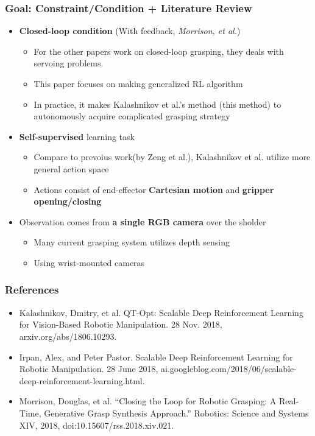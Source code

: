 \documentclass{beamer}
\newcommand{\secondSec}{Goal}
\begin{document}
  \begin{frame}
    \frametitle{\secondSec : Constraint/Condition + Literature Review}
    \begin{itemize}
      \item \textbf{Closed-loop condition} (With feedback, \textit{\scriptsize{Morrison, et al.}})
      \begin{itemize}
        \item For the other papers work on closed-loop grasping, they deals with servoing problems.
        \item This paper focuses on making generalized RL algorithm
        \item In practice, it makes Kalashnikov et al.'s method (this method)
              to autonomously acquire complicated grasping strategy
      \end{itemize}
      \pause
      \item \textbf{Self-supervised} learning task
      \begin{itemize}
        \item Compare to prevoius work(by Zeng et al.), Kalashnikov et al. utilize more general action space
        \item Actions consist of end-effector \textbf{Cartesian motion} and \textbf{gripper opening/closing}
      \end{itemize}
      \pause
      \item Observation comes from \textbf{a single RGB camera} over the sholder
      \begin{itemize}
        \item Many current grasping system utilizes depth sensing
        \item Using wrist-mounted cameras
      \end{itemize}
    \end{itemize}
  \end{frame}

  \begin{frame}
    \frametitle{References}
    \begin{itemize}
      \item Kalashnikov, Dmitry, et al. QT-Opt: Scalable Deep Reinforcement Learning for Vision-Based Robotic Manipulation. 28 Nov. 2018, arxiv.org/abs/1806.10293.
      \item Irpan, Alex, and Peter Pastor. Scalable Deep Reinforcement Learning for Robotic Manipulation. 28 June 2018, ai.googleblog.com/2018/06/scalable-deep-reinforcement-learning.html.
      \item Morrison, Douglas, et al. “Closing the Loop for Robotic Grasping: A Real-Time, Generative Grasp Synthesis Approach.” Robotics: Science and Systems XIV, 2018, doi:10.15607/rss.2018.xiv.021.
    \end{itemize}
  \end{frame}
\end{document}
